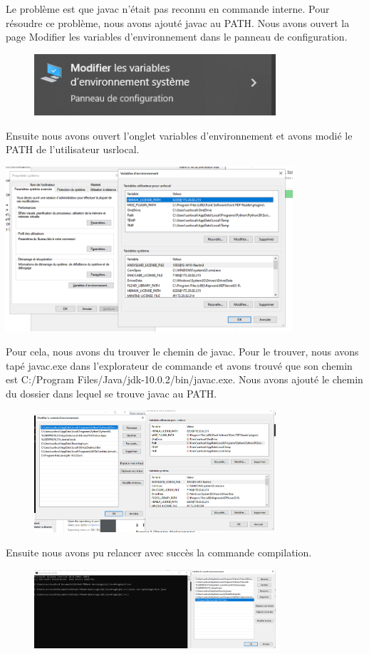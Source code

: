 \documentclass{article}
\begin{document}
 Le problème est que javac n'était pas reconnu en commande interne. Pour résoudre ce problème, nous avons ajouté javac au PATH.
 Nous avons ouvert la page Modifier les variables d'environnement dans le panneau de configuration.

\begin{figure}[h]
\includegraphics[width=0.8\textwidth]{Annotation 2023-01-10 143053.png}
\end{figure}

Ensuite nous avons ouvert l'onglet variables d'environnement et avons modié le PATH de l'utilisateur usrlocal.

\includegraphics[width=0.8\textwidth]{Annotation 2023-01-10 143100.png}


Pour cela, nous avons du trouver le chemin de javac. Pour le trouver, nous avons tapé javac.exe dans l'explorateur de commande et avons trouvé que son chemin est C:/Program Files/Java/jdk-10.0.2/bin/javac.exe.
Nous avons ajouté le chemin du dossier dans lequel se trouve javac au PATH.


\begin{figure}[h]
\includegraphics[width=0.8\textwidth]{Annotation 2023-01-10 145746.png}
\end{figure}
Ensuite nous avons pu relancer avec succès la commande compilation.
\begin{figure}[h]
\includegraphics[width=0.8\textwidth]{Annotation 2023-01-10 145813.png}
\end{figure}
\end{document}
